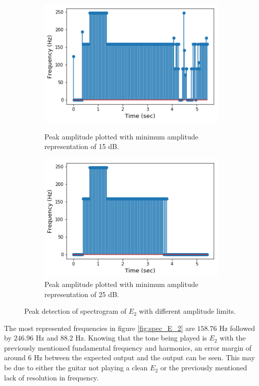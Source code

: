 \begin{figure}[H]
\begin{subfigure}{0.49\textwidth}
\end{subfigure}
\begin{subfigure}{0.49\textwidth}
\centering
\includegraphics[width=\textwidth]{figures/peak_detection/20170511_15.png}
\caption{Peak amplitude plotted with minimum amplitude representation of 15 dB.}
\label{fig:freq_15dB_Amp_pass}

\includegraphics[width=\textwidth]{figures/peak_detection/20170511_25.png}
\caption{Peak amplitude plotted with minimum amplitude representation of 25 dB.}
\label{fig:freq_25dB_Amp_pass}

\end{subfigure}
\caption{Peak detection of spectrogram of $E_2$ with different amplitude limits.}
\label{fig:valdation_peak_detection}
\end{figure}

The most represented frequencies in figure \ref{fig:spec_E_2} are $158.76$ Hz followed by $246.96$ Hz and $88.2$ Hz. 
Knowing that the tone being played is $E_2$ with the previously mentioned fundamental frequency and harmonics, an error margin of around $6$ Hz between the expected output and the output can be seen.
This may be due to either the guitar not playing a clean $E_2$ or the previously mentioned lack of resolution in frequency.

